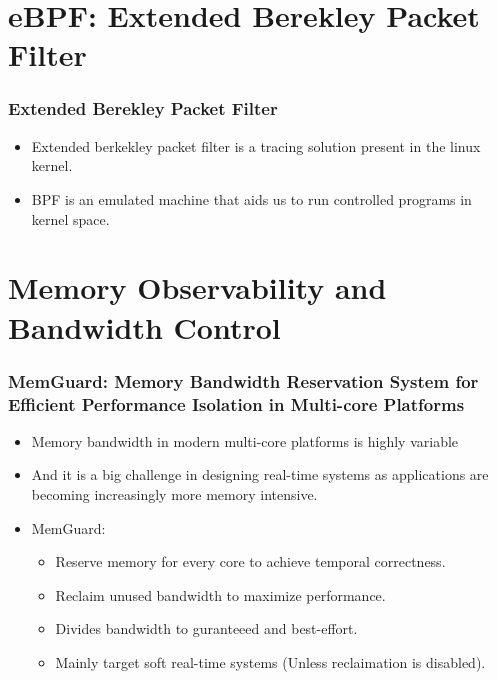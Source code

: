 \documentclass{beamer}
\begin{document}
\section{eBPF: Extended Berekley Packet Filter}
\begin{frame}
    \frametitle{Extended Berekley Packet Filter}
    \begin{itemize}
        \item Extended berkekley packet filter is a tracing solution present
            in the linux kernel.
        \item BPF is an emulated machine that aids us to run controlled
            programs in kernel space.
    \end{itemize}
\end{frame}
\section{Memory Observability and Bandwidth Control}
\begin{frame}
    \frametitle{MemGuard: Memory Bandwidth Reservation System for Efficient
    Performance Isolation in Multi-core Platforms}
    \begin{itemize}
        \item Memory bandwidth in modern multi-core platforms is highly
            variable
        \item And it is a big challenge in designing real-time systems as
            applications are becoming increasingly more memory intensive.
        \item MemGuard:
            \begin{itemize}
                \item Reserve memory for every core to achieve temporal
                    correctness.
                \item Reclaim unused bandwidth to maximize performance.
                \item Divides bandwidth to guranteeed and best-effort.
                \item Mainly target soft real-time systems
                    (Unless reclaimation is disabled).
            \end{itemize}
    \end{itemize}
\end{frame}
\end{document}
